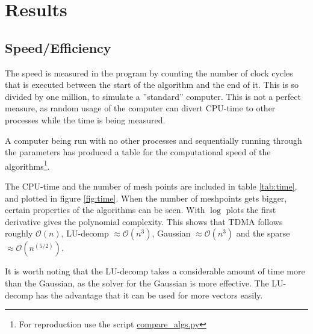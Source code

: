 \documentclass[11pt,a4paper,english,draft]{article}
\numberwithin{equation}{section}
\newcommand{\bigO}[1]{\mathcal{O}\left( #1 \right)}
\begin{document}
\section{Results}

\subsection{Speed/Efficiency}

The speed is measured in the program by counting the number of clock
cycles that is executed between the start of the algorithm and the 
end of it. This is so divided by one million, to simulate a 
''standard'' computer. This is not a perfect measure, as random usage
of the computer can divert CPU-time to other processes while the time
is being measured. 

A computer being run with no other processes and sequentially running
through the parameters has produced a table for the computational speed
of the algorithms\footnote{For reproduction use the script 
\url{compare_algs.py}}.

The CPU-time and the number of mesh points are included
in table \ref{tab:time}, and plotted in figure \ref{fig:time}. When
the number of meshpoints gets bigger, certain properties of the algorithms
can be seen. With $\log$ plots the first derivative gives the polynomial 
complexity. This shows that TDMA follows roughly $\bigO{n}$,
LU-decomp $\approx \bigO{n^3}$, Gaussian $\approx \bigO{n^3}$ and the 
sparse $\approx \bigO{n^{(5/2)}}$. 

It is worth noting that the 
LU-decomp takes a considerable amount of time more than the Gaussian,
as the solver for the Gaussian is more effective. The LU-decomp has
the advantage that it can be used for more vectors easily.
\end{document}
